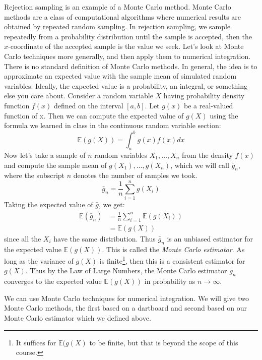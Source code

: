 \documentclass[12pt]{article}
\theoremstyle{definition}
\theoremstyle{remark}
\def\E{{\mathbb E}}
\begin{document}
Rejection sampling is an example of a Monte Carlo method. Monte Carlo methods are a class of computational algorithms where numerical results are obtained by repeated random sampling. In rejection sampling, we sample repeatedly from a probability distribution until the sample is accepted, then the $x$-coordinate of the accepted sample is the value we seek. Let's look at Monte Carlo techniques more generally, and then apply them to numerical integration.\\

There is no standard definition of Monte Carlo methods. In general, the idea is to approximate an expected value with the sample mean of simulated random variables. Ideally, the expected value is a probability, an integral, or something else you care about. Consider a random variable $X$ having probability density function $f(x)$ defined on the interval $[a, b]$. Let $g(x)$ be a real-valued function of x. Then we can compute the expected value of $g(X)$ using the formula we learned in class in the continuous random variable section:
\[
\E(g(X)) = \int_a^b g(x) f(x) dx
\]
Now let's take a sample of $n$ random variables $X_1, \dots, X_n$ from the density $f(x)$ and compute the sample mean of $g(X_1), \dots, g(X_n)$, which we will call $\bar{g}_n$, where the subscript $n$ denotes the number of samples we took.
\[
\bar{g}_n = \frac{1}{n}\sum_{i=1}^n g(X_i)
\]
Taking the expected value of $\bar{g}$, we get:
\begin{align*}
\E(\bar{g}_n) &= \frac{1}{n}\sum_{i=1}^n \E(g(X_i))\\
&= \E(g(X))
\end{align*}
since all the $X_i$ have the same distribution. Thus $\bar{g}_n$ is an unbiased estimator for the expected value $\E(g(X))$. This is called the \emph{Monte Carlo estimator}. As long as the variance of $g(X)$ is finite\footnote{It suffices for $\E(g(X)$ to be finite, but that is beyond the scope of this course.}, then this is a consistent estimator for $g(X)$. Thus by the Law of Large Numbers, the Monte Carlo estimator $\bar{g}_n$ converges to the expected value $\E(g(X))$ in probability as $n \rightarrow \infty$.

We can use Monte Carlo techniques for numerical integration. We will give two Monte Carlo methods, the first based on a dartboard and second based on our Monte Carlo estimator which we defined above.\\
\end{document}
